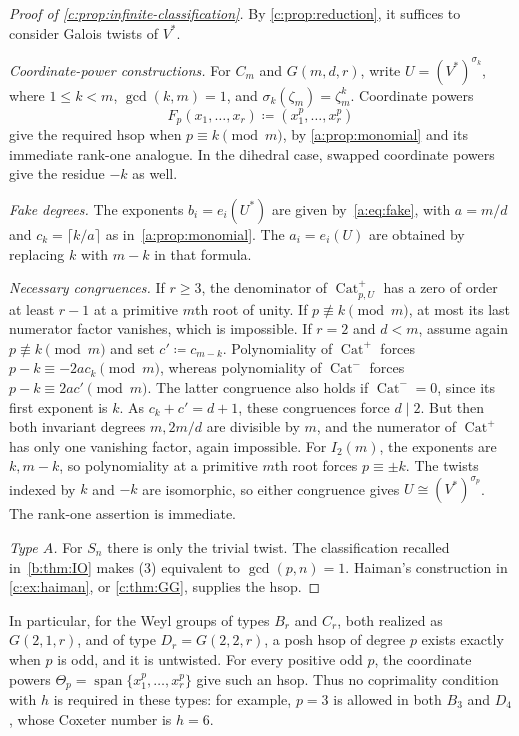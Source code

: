 \documentclass[10pt,a4paper]{amsart}
\newcommand{\defeq}{\coloneqq}
\DeclareMathOperator{\Cat}{Cat}
\theoremstyle{definition}
\begin{document}
\begin{proof}[Proof of \cref{c:prop:infinite-classification}]
By \cref{c:prop:reduction}, it suffices to consider Galois twists of
$V^*$.

\emph{Coordinate-power constructions.}
For $C_m$ and $G(m,d,r)$, write $U=(V^*)^{\sigma_k}$, where
$1\le k<m$, $\gcd(k,m)=1$, and
$\sigma_k(\zeta_m)=\zeta_m^k$. Coordinate powers
\[
 F_p(x_1,\ldots,x_r)\defeq(x_1^p,\ldots,x_r^p)
\]
give the required hsop when $p\equiv k\pmod m$, by
\cref{a:prop:monomial} and its immediate rank-one analogue.
In the dihedral case, swapped coordinate powers give the residue
$-k$ as well.

\emph{Fake degrees.}
The exponents $b_i=e_i(U^*)$ are given by~\cref{a:eq:fake}, with
$a=m/d$ and $c_k=\lceil k/a\rceil$ as in~\cref{a:prop:monomial}.
The $a_i=e_i(U)$ are obtained by replacing $k$ with $m-k$ in that formula.

\emph{Necessary congruences.}
If $r\ge3$, the denominator of $\Cat^+_{p,U}$ has a zero of order at least
$r-1$ at a primitive $m$th root of unity. If $p\not\equiv k\pmod m$,
at most its last numerator factor vanishes, which is impossible.
If $r=2$ and $d<m$, assume again $p\not\equiv k\pmod m$ and set
$c'\defeq c_{m-k}$. Polynomiality of $\Cat^+$ forces
$p-k\equiv-2ac_k\pmod m$, whereas polynomiality of $\Cat^-$ forces
$p-k\equiv2ac'\pmod m$. The latter congruence also holds if $\Cat^-=0$,
since its first exponent is $k$. As $c_k+c'=d+1$, these congruences
force $d\mid2$. But then both invariant degrees $m,2m/d$ are divisible
by $m$, and the numerator of $\Cat^+$ has only one vanishing factor, again
impossible. For $I_2(m)$, the exponents are $k,m-k$, so polynomiality at
a primitive $m$th root forces $p\equiv\pm k$.
The twists indexed by $k$ and $-k$ are isomorphic, so either congruence
gives $U\cong(V^*)^{\sigma_p}$.
The rank-one assertion is immediate.

\emph{Type $A$.}
For $S_n$ there is only the trivial twist. The classification recalled
in~\cref{b:thm:IO} makes (3) equivalent to $\gcd(p,n)=1$.
Haiman's construction
in \cref{c:ex:haiman}, or \cref{c:thm:GG}, supplies the hsop.
\end{proof}

In particular, for the Weyl groups of types $B_r$ and $C_r$, both
realized as $G(2,1,r)$, and of type $D_r=G(2,2,r)$, a posh hsop
of degree $p$ exists exactly when $p$ is odd, and it is untwisted.
For every positive odd $p$, the coordinate powers
$\Theta_p=\operatorname{span}\{x_1^p,\ldots,x_r^p\}$ give such an hsop.
Thus no coprimality condition with $h$ is required in these types:
for example, $p=3$ is allowed in both $B_3$ and $D_4$, whose Coxeter
number is $h=6$.
\end{document}
